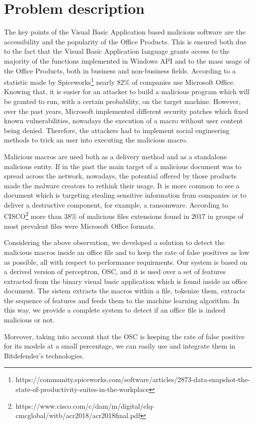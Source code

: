 \section{Problem description}

The key points of the Visual Basic Application based malicious software are the accessibility and the popularity of the Office Products. This is ensured both due to the fact that the Visual Basic Application language grants access to the majority of the functions implemented in Windows API and to the mass usage of the Office Products, both in business and non-business fields. According to a statistic made by Spiceworks\footnote{https://community.spiceworks.com/software/articles/2873-data-snapshot-the-state-of-productivity-suites-in-the-workplace} nearly 82\% of companies use Microsoft Office. Knowing that, it is easier for an attacker to build a malicious program which will be granted to run, with a certain probability, on the target machine. However, over the past years, Microsoft implemented different security patches which fixed known vulnerabilities, nowadays the execution of a macro without user content being denied. Therefore, the attackers had to implement social engineering methods to trick an user into executing the malicious macro.
\par
Malicious macros are used both as a delivery method and as a standalone malicious entity. If in the past the main target of a malicious document was to spread across the network, nowadays, the potential offered by those products made the malware creators to rethink their usage. It is more common to see a document which is targeting stealing sensitive information from companies or to deliver a destructive component, for example, a ransomware. According to CISCO\footnote{https://www.cisco.com/c/dam/m/digital/elq-cmcglobal/witb/acr2018/acr2018final.pdf} more than 38\% of malicious files extensions found in 2017 in groups of most prevalent files were Microsoft Office formats.
\par
Considering the above observation, we developed a solution to detect the malicious macros inside an office file and to keep the rate of false positives as low as possible, all with respect to performance requirments. Our system is based on a derived version of perceptron, OSC\cite{OSC}, and it is used over a set of features extracted from the binary visual basic application which is found inside an office document. The sistem extracts the macros within a file, tokenize them, extracts the sequence of features and feeds them to the machine learning algorithm. In this way, we provide a complete system to detect if an office file is indeed malicious or not.
\par
Moreover, taking into account that the OSC is keeping the rate of false positive for its models at a small percentage, we can easily use and integrate them in Bitdefender's technologies.
